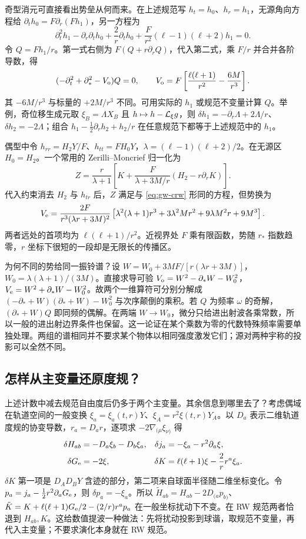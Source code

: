 奇型消元可直接看出势垒从何而来。在上述规范写 $h_t=h_0$、$h_r=h_1$，无源角向方程给 $\partial_t h_0=F\partial_r(Fh_1)$，另一方程为
\[
 \partial_t^2h_1-\partial_r\partial_t h_0
 +\frac2r\partial_t h_0+\frac{F}{r^2}(\ell-1)(\ell+2)h_1=0 .
\]
令 $Q=Fh_1/r$。第一式右侧为 $F(Q+r\partial_r Q)$，代入第二式，乘 $F/r$ 并合并各阶导数，得
\begin{equation}
 (-\partial_t^2+\partial_*^2-V_{\rm o})Q=0,\qquad
 V_{\rm o}=F\left[\frac{\ell(\ell+1)}{r^2}-\frac{6M}{r^3}\right].
 \label{eq:gw-crw}
\end{equation}
其 $-6M/r^3$ 与标量的 $+2M/r^3$ 不同。可用实际的 $h_1$ 或规范不变量计算 $Q$。举例，奇位移生成元取 $\xi_B=\Lambda X_B$ 且 $h\mapsto h-{\cal L}_\xi g$，则 $\delta h_1=-\partial_r\Lambda+2\Lambda/r$、$\delta h_2=-2\Lambda$；组合 $h_1-\tfrac12\partial_r h_2+h_2/r$ 在任意规范下都等于上述规范中的 $h_1$。

偶型中令 $h_{rr}=H_2Y/F$、$h_{tt}=F H_0Y$，$\lambda=(\ell-1)(\ell+2)/2$。在无源区 $H_0=H_2$。一个常用的 Zerilli--Moncrief 归一化为
\[
 Z=\frac{r}{\lambda+1}\left[
 K+\frac{F}{\lambda+3M/r}(H_2-r\partial_rK)\right].
\]
代入约束消去 $H_2$ 与 $h_{tr}$ 后，$Z$ 满足与 \eqref{eq:gw-crw} 形同的方程，但势换为
\[
 V_{\rm e}=\frac{2F}{r^3(\lambda r+3M)^2}
 \left[\lambda^2(\lambda+1)r^3+3\lambda^2Mr^2
                         +9\lambda M^2r+9M^3\right].
\]
两者远处的首项均为 $\ell(\ell+1)/r^2$。近视界处 $F$ 乘有限函数，势随 $r_*$ 指数趋零，$r$ 坐标下很短的一段却是无限长的传播区。

为何不同的势给同一振铃谱？设 $W=W_0+3MF/[r(\lambda r+3M)]$，$W_0=\lambda(\lambda+1)/(3M)$。直接求导可验 $V_{\rm o}=W^2-\partial_*W-W_0^2$，$V_{\rm e}=W^2+\partial_*W-W_0^2$。故两个一维算符可分别分解成 $(-\partial_*+W)(\partial_*+W)-W_0^2$ 与次序颠倒的乘积。若 $Q$ 为频率 $\omega$ 的奇解，$(\partial_*+W)Q$ 即同频的偶解。在两端 $W\to W_0$，微分只给进出射波各乘常数，所以一般的进出射边界条件也保留。这一论证在某个乘数为零的代数特殊频率需要单独处理。两组的谱相同并不要求某个物体以相同强度激发它们；源对两种宇称的投影可以全然不同。

\subsection{怎样从主变量还原度规？}

上述计数中减去规范自由度后仍多于两个主变量。其余信息到哪里去了？考虑偶域在轨道空间的一般变换 $\xi_a=\xi_a(t,r)Y$、$\xi_A=r^2\xi(t,r)Y_A$。以 $D_a$ 表示二维轨道度规的协变导数，$r_a=D_a r$，逐项求 $-2\nabla_{(\mu}\xi_{\nu)}$ 得
\begin{align*}
 \delta H_{ab}&=-D_a\xi_b-D_b\xi_a,&
 \delta j_a&=-\xi_a-r^2\partial_a\xi,\\
 \delta G_{\rm e}&=-2\xi,&
 \delta K&=\ell(\ell+1)\xi-\frac2r r^a\xi_a .
\end{align*}
$\delta K$ 第一项是 $D_AD_BY$ 含迹的部分，第二项来自球面半径随二维坐标变化。令 $p_a=j_a-\tfrac12r^2\partial_aG_{\rm e}$，则 $\delta p_a=-\xi_a$。所以 $\tilde H_{ab}=H_{ab}-2D_{(a}p_{b)}$、$\tilde K=K+\ell(\ell+1)G_{\rm e}/2-(2/r)r^a p_a$ 在一般坐标扰动下不变。在 RW 规范两者恰退到 $H_{ab},K$。这给数值提波一种做法：先将扰动投影到球谐，取规范不变量，再代入主变量；不要求演化本身就在 RW 规范。

